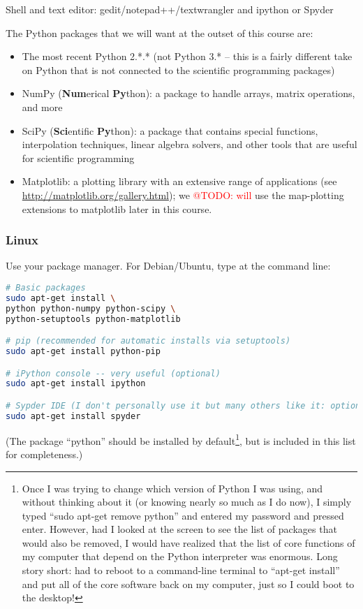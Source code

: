 \documentclass[a4paper,10pt]{amsart}
\makeatletter
\newcommand{\todo}[1]{\textcolor{red}{@TODO: #1}}
\makeatother
\begin{document}
Shell and text editor: gedit/notepad++/textwrangler and ipython or Spyder


The Python packages that we will want at the outset of this course are:
\begin{itemize}
 \item The most recent Python 2.*.* (not Python 3.* -- this is a fairly different take on Python that is not connected to the scientific programming packages)
 \item NumPy (\textbf{Num}erical \textbf{Py}thon): a package to handle arrays, matrix operations, and more
 \item SciPy (\textbf{Sci}entific \textbf{Py}thon): a package that contains special functions, interpolation techniques, linear algebra solvers, and other tools that are useful for scientific programming
 \item Matplotlib: a plotting library with an extensive range of applications (see \url{http://matplotlib.org/gallery.html}); we \todo{will} use the map-plotting extensions to matplotlib later in this course.
\end{itemize}

\subsubsection{Linux}

Use your package manager. For Debian/Ubuntu, type at the command line:

\begin{lstlisting}[language=sh]
# Basic packages
sudo apt-get install \
python python-numpy python-scipy \
python-setuptools python-matplotlib 

# pip (recommended for automatic installs via setuptools)
sudo apt-get install python-pip

# iPython console -- very useful (optional)
sudo apt-get install ipython

# Sypder IDE (I don't personally use it but many others like it: optional)
sudo apt-get install spyder
\end{lstlisting}

(The package ``python'' should be installed by default\footnote{Once I was trying to change which version of Python I was using, and without thinking about it (or knowing nearly so much as I do now), I simply typed ``sudo apt-get remove python'' and entered my password and pressed enter. However, had I looked at the screen to see the list of packages that  would also be removed, I would have realized that the list of core functions of my computer that depend on the Python interpreter was enormous. Long story short: had to reboot to a command-line terminal to ``apt-get install'' and put all of the core software back on my computer, just so I could boot to the desktop!}, but is included in this list for completeness.)
\end{document}
